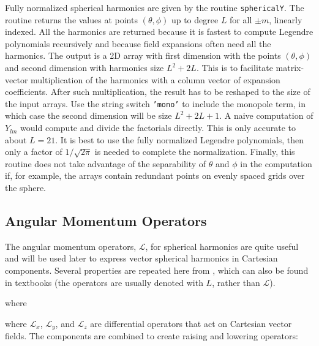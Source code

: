 Fully normalized spherical harmonics are given by the routine \texttt{sphericalY}.  The routine returns the values at points $(\theta,\phi)$ up to degree $L$ for all $\pm m$, linearly indexed.  All the harmonics are returned because it is fastest to compute Legendre polynomials recursively and because field expansions often need all the harmonics. The output is a 2D array with first dimension with the points $(\theta,\phi)$ and second dimension with harmonics size $L^2 + 2L$. This is to facilitate matrix-vector multiplication of the harmonics with a column vector of expansion coefficients. After such multiplication, the result has to be reshaped to the size of the input arrays. Use the string switch \texttt{'mono'} to include the monopole term, in which case the second dimension will be size $L^2 + 2L + 1$.  A naive computation of $Y_{lm}$ would compute and divide the factorials directly.  This is only accurate to about $L=21$.  It is best to use the fully normalized Legendre polynomials, then only a factor of $1/\sqrt{2\pi}$ is needed to complete the normalization.  Finally, this routine does not take advantage of the separability of $\theta$ and $\phi$ in the computation if, for example, the arrays contain redundant points on evenly spaced grids over the sphere.

{\footnotesize
{}
}


\subsection{Angular Momentum Operators}

The angular momentum operators, $\mathcal{L}$, for spherical harmonics are quite useful and will be used later to express vector spherical harmonics in Cartesian components. Several properties are repeated here from \cite{angularmomop}, which can also be found in textbooks (the operators are usually denoted with $L$, rather than $\mathcal{L}$). 

\noindent where 

\noindent where $\mathcal{L}_x$, $\mathcal{L}_y$, and $\mathcal{L}_z$ are differential operators that act on Cartesian vector fields.  The components are combined to create raising and lowering operators:

